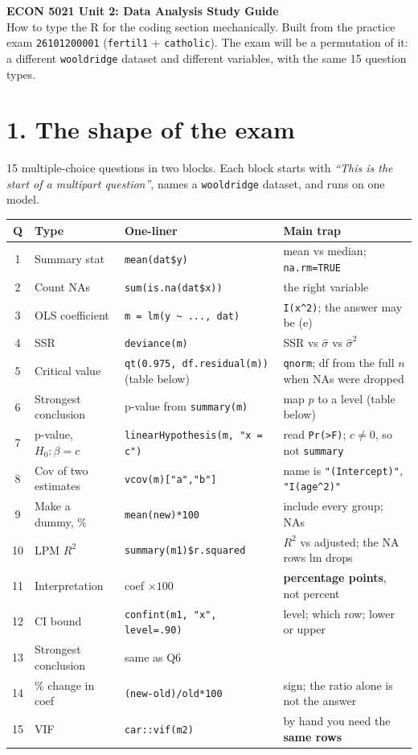 \documentclass[10pt]{article}
\newcommand{\code}[1]{\texttt{#1}}
\begin{document}
{\Large\bfseries ECON 5021 Unit 2: Data Analysis Study Guide}\\[2pt]
{\small How to type the R for the coding section mechanically. Built from the practice exam \code{26101200001} (\code{fertil1} + \code{catholic}). The exam will be a permutation of it: a different \code{wooldridge} dataset and different variables, with the same 15 question types.}

\section*{1. The shape of the exam}
15 multiple-choice questions in two blocks. Each block starts with \textit{``This is the start of a multipart question''}, names a \code{wooldridge} dataset, and runs on one model.

\begin{center}\small
\begin{tabular}{@{}clll@{}}
\toprule
Q & Type & One-liner & Main trap\\ \midrule
1 & Summary stat & \code{mean(dat\$y)} & mean vs median; \code{na.rm=TRUE}\\
2 & Count NAs & \code{sum(is.na(dat\$x))} & the right variable\\
3 & OLS coefficient & \code{m = lm(y \textasciitilde\ ..., dat)} & \code{I(x\^{}2)}; the answer may be (e)\\
4 & SSR & \code{deviance(m)} & SSR vs $\hat\sigma$ vs $\hat\sigma^2$\\
5 & Critical value & \code{qt(0.975, df.residual(m))} (table below) & \code{qnorm}; df from the full $n$ when NAs were dropped\\
6 & Strongest conclusion & p-value from \code{summary(m)} & map $p$ to a level (table below)\\
7 & p-value, $H_0:\beta=c$ & \code{linearHypothesis(m, "x = c")} & read \code{Pr(>F)}; $c\neq0$, so not \code{summary}\\
8 & Cov of two estimates & \code{vcov(m)["a","b"]} & name is \code{"(Intercept)"}, \code{"I(age\^{}2)"}\\ \midrule
9 & Make a dummy, \% & \code{mean(new)*100} & include every group; NAs\\
10 & LPM $R^2$ & \code{summary(m1)\$r.squared} & $R^2$ vs adjusted; the NA rows lm drops\\
11 & Interpretation & coef $\times 100$ & \textbf{percentage points}, not percent\\
12 & CI bound & \code{confint(m1, "x", level=.90)} & level; which row; lower or upper\\
13 & Strongest conclusion & same as Q6 & \\
14 & \% change in coef & \code{(new-old)/old*100} & sign; the ratio alone is not the answer\\
15 & VIF & \code{car::vif(m2)} & by hand you need the \textbf{same rows}\\ \bottomrule
\end{tabular}
\end{center}
\end{document}
